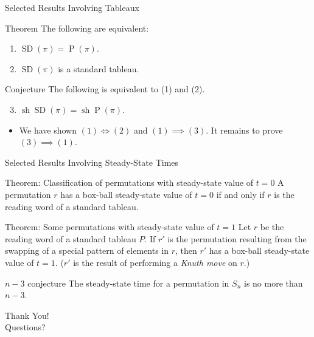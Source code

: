\documentclass[handout, serif]{beamer}
\DeclareMathOperator{\SD}{SD}
\DeclareMathOperator{\Pt}{P}
\DeclareMathOperator{\sh}{sh}
\begin{document}
\begin{frame}{Selected Results Involving Tableaux}
     \begin{alertblock}{Theorem}
        The following are equivalent: \begin{enumerate}
            \item $\SD(\pi) = \Pt(\pi).$
            \item $\SD(\pi)$ is a standard tableau.
        \end{enumerate}
    \end{alertblock}
    \begin{block}{Conjecture}
        The following is equivalent to (1) and (2).
        \begin{enumerate}
            \setcounter{enumi}{2}
            \item $\sh\SD(\pi) = \sh\Pt(\pi).$ 
        \end{enumerate}
    \end{block}
    \begin{itemize}
        \item We have shown $(1)\Longleftrightarrow(2)$ and $(1) \implies (3).$ It remains to prove $(3)\implies(1).$
    \end{itemize}
\end{frame}
\begin{frame}{Selected Results Involving Steady-State Times}
    \begin{alertblock}{Theorem: Classification of permutations with steady-state value of $t=0$}
    A permutation $r$ has a box-ball steady-state value of $t=0$ if and only if $r$ is the reading word of a standard tableau.
    \end{alertblock}
    \begin{alertblock}{Theorem: Some permutations with steady-state value of $t=1$}
     Let $r$ be the reading word of a standard tableau $P$. If $r'$ is the permutation resulting from the swapping of a special pattern of elements in $r$, then $r'$ has a box-ball steady-state value of $t=1.$ ($r'$ is the result of performing a \textit{Knuth move} on $r$.)
    \end{alertblock}
    \small
    \begin{block}{$n-3$ conjecture}
        The steady-state time for a permutation in $S_n$ is no more than $n-3.$
    \end{block}
\end{frame}
\begin{frame}[focus]
        Thank You! \\
        Questions?
\end{frame}
\end{document}
